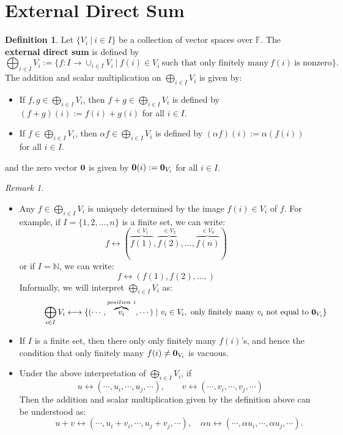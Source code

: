 \documentclass[11pt,openany]{book}
\theoremstyle{plain}
\theoremstyle{definition}
\newtheorem{definition}[definition]{Definition}
\theoremstyle{remark}
\newtheorem{remark}[remark]{Remark}
\begin{document}
\section{External Direct Sum} \label{sec-extdirectsum}
\begin{definition}
Let $\{V_i\ |\ i \in I\}$ be a collection of vector spaces over $\mathbb{F}$. The {\bf external direct sum} is defined by
$$\bigoplus_{i \in I} V_i := \{f: I \to \cup_{i \in I} V_i \ |\ f(i) \in V_i \ \text{such that only finitely many}\ f(i)\ \text{is nonzero}\}.$$
The addition and scalar multiplication on $\bigoplus_{i \in I} V_i$ is given by:
\begin{itemize}
\item If $f, g \in \bigoplus_{i \in I} V_i$, then $f+g \in \bigoplus_{i \in I} V_i$ is defined by $(f+g)(i) := f(i)+g(i)$ for all $i \in I$.
\item If $f \in \bigoplus_{i \in I} V_i$, then $\alpha f \in \bigoplus_{i \in I} V_i$ is defined by $(\alpha f)(i) := \alpha(f(i))$ for all $i \in I$.
\end{itemize}
and the zero vector ${\bf 0}$ is given by ${\bf 0}(i) := {\bf 0}_{V_i}$ for all $i \in I$.
\end{definition}

\begin{remark}\
    \begin{itemize}
        \item Any $f \in \bigoplus_{i \in I} V_i$ is uniquely determined by the image $f(i) \in V_i$ of $f$. For example, if $I = \{1,2,  \dots, n\}$ is a finite set, we can write:
        $$f \longleftrightarrow (\overbrace{f(1)}^{\in V_1}, \overbrace{f(2)}^{\in V_2}, \dots, \overbrace{f(n)}^{\in V_n})$$
        or if $I = \mathbb{N}$, we can write:
        $$f \longleftrightarrow (f(1), f(2), \dots, )$$
        Informally, we will interpret $\bigoplus_{i \in I} V_i$ as:
        $$\quad \quad \quad \bigoplus_{i \in I} V_i \longleftrightarrow \{ (\cdots, \overbrace{v_i}^{position\ i}, \cdots )\ |\ v_i \in V_i,\ \text{only finitely many}\ v_i\ \text{not equal to}\ {\bf 0}_{V_i}\}$$

        \item If $I$ is a finite set, then there only only finitely many $f(i)$'s, and hence the condition that only finitely many $f(i) \neq {\bf 0}_{V_i}$ is vacuous.

        \item Under the above interpretation of $\bigoplus_{i \in I} V_i$, if
        $$\quad u \longleftrightarrow (\cdots, u_i, \cdots, u_j, \cdots ),\quad \quad v \longleftrightarrow (\cdots, v_i, \cdots, v_j, \cdots )$$
        Then the addition and scalar multiplication given by the definition above can be understood as:
        $$\quad \quad \quad u+v \longleftrightarrow (\cdots, u_i + v_i, \cdots, u_j+v_j, \cdots ), \quad \alpha u \longleftrightarrow (\cdots, \alpha u_i, \cdots, \alpha u_j, \cdots ).$$
    \end{itemize}
\end{remark}
\end{document}
